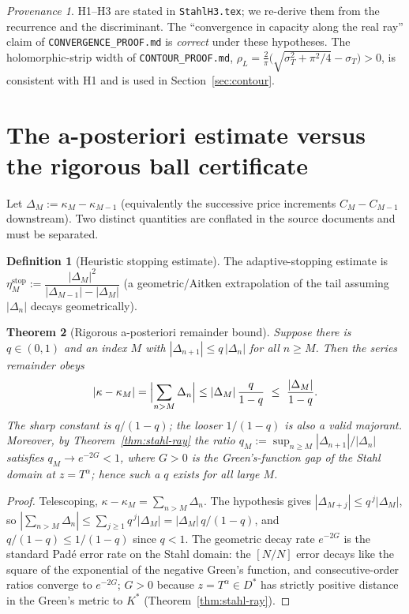 \documentclass[11pt]{article}
\theoremstyle{plain}
\newtheorem{theorem}{Theorem}[section]
\theoremstyle{definition}
\newtheorem{definition}[theorem]{Definition}
\theoremstyle{remark}
\newtheorem*{provenance}{Provenance}
\begin{document}
\begin{provenance}
H1--H3 are stated in \texttt{StahlH3.tex}; we re-derive them from the recurrence
and the discriminant. The ``convergence in capacity along the real ray'' claim of
\texttt{CONVERGENCE\_PROOF.md} is \emph{correct} under these hypotheses. The
holomorphic-strip width of \texttt{CONTOUR\_PROOF.md},
$\rho_L=\tfrac{2}{\pi}\bigl(\sqrt{\sigma_T^2+\pi^2/4}-\sigma_T\bigr)>0$, is
consistent with H1 and is used in Section~\ref{sec:contour}.
\end{provenance}

\section{The a-posteriori estimate versus the rigorous ball certificate}
\label{sec:aposteriori}

Let $\Delta_M:=\kappa_M-\kappa_{M-1}$ (equivalently the successive price
increments $C_M-C_{M-1}$ downstream). Two distinct quantities are conflated in the
source documents and must be separated.

\begin{definition}[Heuristic stopping estimate]\label{def:heuristic}
The adaptive-stopping estimate is
$\eta_M^{\mathrm{stop}}:=\dfrac{|\Delta_M|^2}{|\Delta_{M-1}|-|\Delta_M|}$
(a geometric/Aitken extrapolation of the tail assuming $|\Delta_n|$ decays
geometrically).
\end{definition}

\begin{theorem}[Rigorous a-posteriori remainder bound]\label{thm:aposteriori}
Suppose there is $q\in(0,1)$ and an index $M$ with $|\Delta_{n+1}|\le q\,|\Delta_n|$
for all $n\ge M$. Then the series remainder obeys
\begin{equation}\label{eq:apost}
   |\kappa-\kappa_M|=\Bigl|\sum_{n>M}\Delta_n\Bigr|
   \le |\Delta_M|\,\frac{q}{1-q}\ \le\ \frac{|\Delta_M|}{1-q}.
\end{equation}
The sharp constant is $q/(1-q)$; the looser $1/(1-q)$ is also a valid majorant.
Moreover, by Theorem~\ref{thm:stahl-ray} the ratio
$q_M:=\sup_{n\ge M}|\Delta_{n+1}|/|\Delta_n|$ satisfies $q_M\to e^{-2G}<1$, where
$G>0$ is the Green's-function gap of the Stahl domain at $z=T^\alpha$; hence such a
$q$ exists for all large $M$.
\end{theorem}
\begin{proof}
Telescoping, $\kappa-\kappa_M=\sum_{n>M}\Delta_n$. The hypothesis gives
$|\Delta_{M+j}|\le q^{\,j}|\Delta_M|$, so
$|\sum_{n>M}\Delta_n|\le\sum_{j\ge1}q^{\,j}|\Delta_M|=|\Delta_M|\,q/(1-q)$, and
$q/(1-q)\le1/(1-q)$ since $q<1$. The geometric decay rate $e^{-2G}$ is the standard
Padé error rate on the Stahl domain: the $[N/N]$ error decays like the square of
the exponential of the negative Green's function, and consecutive-order ratios
converge to $e^{-2G}$; $G>0$ because $z=T^\alpha\in D^\ast$ has strictly positive
distance in the Green's metric to $K^\ast$ (Theorem~\ref{thm:stahl-ray}).
\end{proof}
\end{document}

